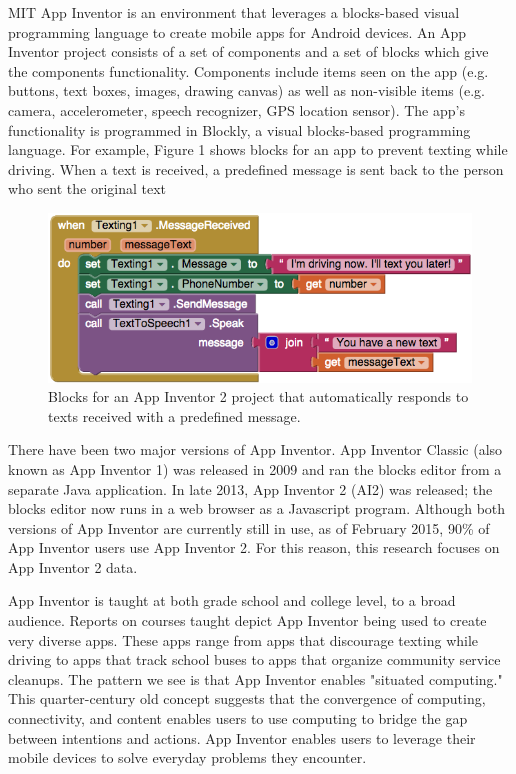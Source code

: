 \documentclass[conference]{IEEEtran}
\begin{document}
 

MIT App Inventor is an environment that leverages a blocks-based visual programming language to create mobile apps for Android devices. An App Inventor project consists of a set of components and a set of blocks which give the components functionality. Components include items seen on the app (e.g. buttons, text boxes, images, drawing canvas) as well as non-visible items (e.g. camera, accelerometer, speech recognizer, GPS location sensor).\cite{blockly} The app's functionality is programmed in Blockly, a visual blocks-based programming language. For example, Figure 1 shows blocks for an app to prevent texting while driving. When a text is received, a predefined message is sent back to the person who sent the original text\cite{ai_home}

\begin{figure}[h!]
	\centering
	\includegraphics[width=0.95\linewidth]{fig1.png}
	\caption{Blocks for an App Inventor 2 project that automatically responds to texts received with a predefined message.}
	\label{FIgure 1: Label}
\end{figure}

There have been two major versions of App Inventor. App Inventor Classic (also known as App Inventor 1) was released in 2009 and ran the blocks editor from a separate Java application. In late 2013, App Inventor 2 (AI2) was released; the blocks editor now runs in a web browser as a Javascript program.\cite{naming:turbak} Although both versions of App Inventor are currently still in use, as of February 2015, 90\% of App Inventor users use App Inventor 2. For this reason, this research focuses on App Inventor 2 data.

App Inventor is taught at both grade school and college level, to a broad audience. Reports on courses taught depict App Inventor being used to create very diverse apps. These apps range from apps that discourage texting while driving to apps that track school buses to apps that organize community service cleanups.\cite{thinking:turbak} The pattern we see is that App Inventor enables "situated computing." This quarter-century old concept suggests that the convergence of computing, connectivity, and content enables users to use computing to bridge the gap between intentions and actions. App Inventor enables users to leverage their mobile devices to solve everyday problems they encounter. \cite{situated:gershman}
\end{document}
